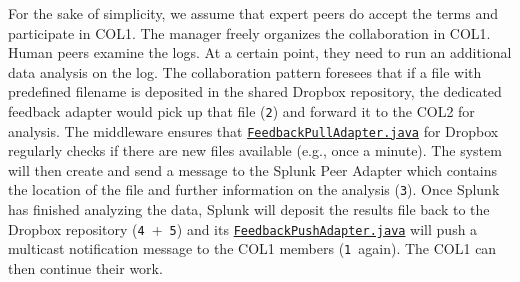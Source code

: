 \documentclass{llncs}
\begin{document}
    For the sake of simplicity, we assume that expert peers do accept the terms and participate in COL1. The manager freely organizes the collaboration in COL1. Human peers examine the logs. At a certain point, they need to run an additional data analysis on the log. The collaboration pattern foresees that if a file with predefined filename is deposited in the shared Dropbox repository, the dedicated feedback adapter would pick up that file (\texttt{2}\degree) and forward it to the COL2 for analysis. The middleware ensures that \texttt{\href{https://github.com/tuwiendsg/SmartCom/blob/master/api/src/main/java/at/ac/tuwien/dsg/smartcom/adapter/InputPullAdapter.java}{FeedbackPullAdapter.java}} for Dropbox regularly checks if there are new files available (e.g., once a minute).
	  The system will then create and send a message to the Splunk Peer Adapter which contains the location of the file and further information on the analysis (\texttt{3}\degree). Once Splunk has finished analyzing the data, Splunk will deposit the results file back to the Dropbox repository (\texttt{4}\degree~+~\texttt{5}\degree) and its \texttt{\href{https://github.com/tuwiendsg/SmartCom/blob/master/api/src/main/java/at/ac/tuwien/dsg/smartcom/adapter/InputPushAdapter.java}{FeedbackPushAdapter.java}} will push a multicast notification message to the COL1 members (\texttt{1}\degree~again). The COL1 can then continue their work.


\end{document}
